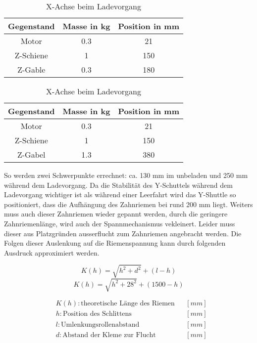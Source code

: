 \begin{table}[H]
    \centering
    \centering
        \begin{tabular}{c c c}
            Gegenstand & Masse in kg & Position in mm\\
            \hline
            Motor & 0.3 & 21 \\
            Z-Schiene & 1 & 150 \\
            Z-Gable & 0.3 & 180 
        \end{tabular}
    \caption{X-Achse unbeladen und eingefahren}
        \vspace{5mm}
        \centering
        \begin{tabular}{c c c}
            Gegenstand & Masse in kg & Position in mm\\ 
            \hline
            Motor & 0.3 & 21 \\
            Z-Schiene & 1 & 150 \\
            Z-Gabel & 1.3 & 380
        \end{tabular}
        \caption{X-Achse beim Ladevorgang}
\end{table}
So werden zwei Schwerpunkte errechnet: ca. 130 mm im unbeladen und 250 mm während dem Ladevorgang. Da die Stabilität des Y-Schuttels während dem Ladevorgang wichtiger ist als während einer Leerfahrt wird das Y-Shuttle so positioniert, dass die Aufhängung des Zahnriemen bei rund 200 mm liegt.
Weiters muss auch dieser Zahnriemen wieder gepannt werden, durch die geringere Zahnriemenlänge, wird auch der Spannmechanismus vekleinert.
Leider muss dieser aus Platzgründen ausserflucht zum Zahnriemen angebracht werden. Die Folgen dieser Auslenkung auf die Riemenspannung kann durch folgenden Ausdruck approximiert werden.
    
    \vspace{4mm}
    \noindent\begin{minipage}{\textwidth}
    \begin{minipage}[t]{0.5\textwidth}
        \begin{equation*}
            K(h) = \sqrt{h^2+d^2}+(l-h)
        \end{equation*}
        \begin{equation*}
            K(h) = \sqrt{h^2+28^2}+(1500-h)
        \end{equation*}
    \end{minipage}%
    \begin{minipage}[t]{0.5\textwidth}
        \vspace{-7mm}
        \begin{align*}
            &K(h): \text{theoretische Länge des Riemen} & &\left[mm\right]\\
            &h: \text{Position des Schlittens} & &\left[mm\right]\\
            &l: \text{Umlenkungsrollenabstand} & &\left[mm\right]\\
            &d: \text{Abstand der Kleme zur Flucht} & &\left[mm\right]
        \end{align*}
    \end{minipage}
    \end{minipage}

